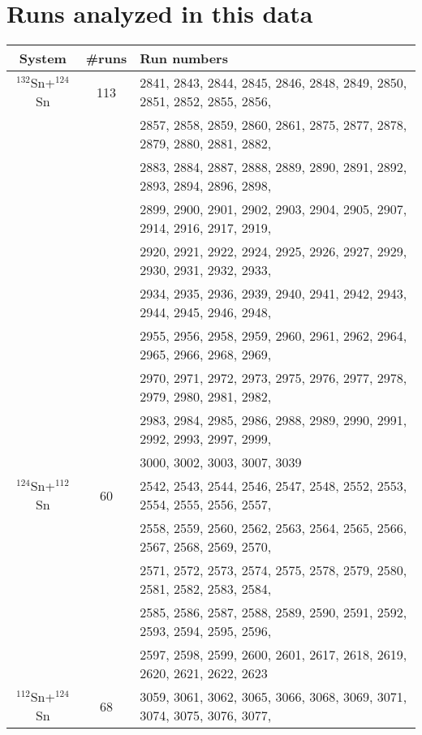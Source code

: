 \chapter{Runs analyzed in this data}
\newcommand{\hsn}{$^{132}$Sn+$^{124}$Sn}
\newcommand{\mhsn}{$^{124}$Sn+$^{112}$Sn}
\newcommand{\mlsn}{$^{112}$Sn+$^{124}$Sn}
\newcommand{\lsn}{$^{108}$Sn+$^{112}$Sn}


\begin{table}[H]
  \begin{center}
    \begin{tabular}{ccl}
      \hline
      System & \#runs & Run numbers \\
      \hline\hline
      \hsn & 113 & 2841, 2843, 2844, 2845, 2846, 2848, 2849, 2850, 2851, 2852, 2855, 2856, \\
      & & 2857, 2858, 2859, 2860, 2861, 2875, 2877, 2878, 2879, 2880, 2881, 2882, \\
      & & 2883, 2884, 2887, 2888, 2889, 2890, 2891, 2892, 2893, 2894, 2896, 2898, \\
      & & 2899, 2900, 2901, 2902, 2903, 2904, 2905, 2907, 2914, 2916, 2917, 2919, \\
      & & 2920, 2921, 2922, 2924, 2925, 2926, 2927, 2929, 2930, 2931, 2932, 2933, \\
      & & 2934, 2935, 2936, 2939, 2940, 2941, 2942, 2943, 2944, 2945, 2946, 2948, \\
      & & 2955, 2956, 2958, 2959, 2960, 2961, 2962, 2964, 2965, 2966, 2968, 2969, \\
      & & 2970, 2971, 2972, 2973, 2975, 2976, 2977, 2978, 2979, 2980, 2981, 2982, \\
      & & 2983, 2984, 2985, 2986, 2988, 2989, 2990, 2991, 2992, 2993, 2997, 2999, \\
      & & 3000, 3002, 3003, 3007, 3039 \\
      \hline
      \mhsn & 60 & 2542, 2543, 2544, 2546, 2547, 2548, 2552, 2553, 2554, 2555, 2556, 2557, \\
      & & 2558, 2559, 2560, 2562, 2563, 2564, 2565, 2566, 2567, 2568, 2569, 2570, \\
      & & 2571, 2572, 2573, 2574, 2575, 2578, 2579, 2580, 2581, 2582, 2583, 2584, \\
      & & 2585, 2586, 2587, 2588, 2589, 2590, 2591, 2592, 2593, 2594, 2595, 2596, \\
      & & 2597, 2598, 2599, 2600, 2601, 2617, 2618, 2619, 2620, 2621, 2622, 2623  \\
      \hline
      \mlsn & 68 & 3059, 3061, 3062, 3065, 3066, 3068, 3069, 3071, 3074, 3075, 3076, 3077, \\

\end{tabular}
\end{center}
\end{table}
